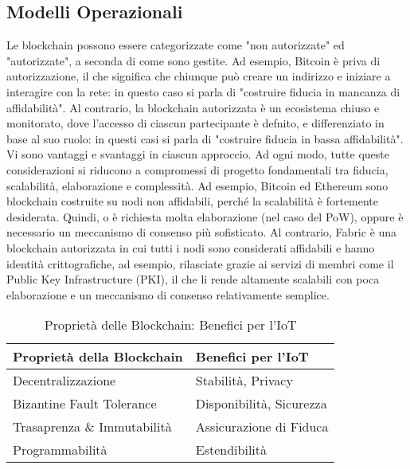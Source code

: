 \subsection{Modelli Operazionali}
Le blockchain possono essere categorizzate come "non autorizzate" ed "autorizzate", a seconda di come sono gestite. Ad esempio, Bitcoin è priva di autorizzazione, il che significa che chiunque può creare un indirizzo e iniziare a interagire con la rete: in questo caso si parla di "costruire fiducia in mancanza di affidabilità". Al contrario, la blockchain autorizzata è un ecosistema chiuso e monitorato, dove l'accesso di ciascun partecipante è defnito, e differenziato in base al suo ruolo: in questi casi si parla di "costruire fiducia in bassa affidabilità".
Vi sono vantaggi e svantaggi in ciascun approccio. Ad ogni modo, tutte queste considerazioni si riducono a compromessi di progetto fondamentali tra fiducia, scalabilità, elaborazione e complessità. Ad esempio, Bitcoin ed Ethereum sono blockchain costruite su nodi non affidabili, perché la scalabilità è fortemente desiderata. Quindi, o è richiesta molta elaborazione (nel caso del PoW), oppure è necessario un meccanismo di consenso più sofisticato. Al contrario, Fabric \cite{c14} è una blockchain autorizzata in cui tutti i nodi sono considerati affidabili e hanno identità crittografiche, ad esempio, rilasciate grazie ai servizi di membri come il Public Key Infrastructure (PKI), il che li rende altamente scalabili con poca elaborazione e un meccanismo di consenso relativamente semplice.

\begin{table}[htp]%
	\caption{Proprietà delle Blockchain: Benefici per l'IoT}
	\label{table:BlockchainBenefits}\centering %
	\begin{tabular}{l|l}
		\hline
		Proprietà della Blockchain  & Benefici per l'IoT       \\
		\hline
		Decentralizzazione          & Stabilità, Privacy       \\
		Bizantine Fault Tolerance   & Disponibilità, Sicurezza \\
		Trasaprenza \& Immutabilità & Assicurazione di Fiduca  \\
		Programmabilità             & Estendibilità            \\
		\hline
	\end{tabular}
\end{table}
